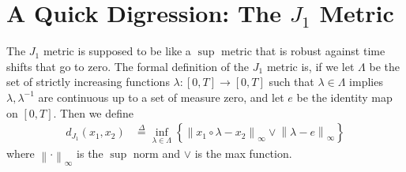 \documentclass[12pt]{article}
\newcommand\norm[1]{\left\lVert#1\right\rVert}
\newcommand{\define}{\overset{\Delta}{=}}
\theoremstyle{definition}
\theoremstyle{definition}
\theoremstyle{definition}
\begin{document}
\section*{A Quick Digression: The $J_1$ Metric}
The $J_1$ metric is supposed to be like a $\sup$ metric that is robust against time shifts that go to zero. The formal definition of the $J_1$ metric is, if we let $\Lambda$ be the set of strictly increasing functions $\lambda:[0,T]\rightarrow [0,T]$ such that $\lambda\in \Lambda$ implies $\lambda,\lambda^{-1}$ are continuous up to a set of measure zero, and let $e$ be the identity map on $[0,T]$. Then we define
\begin{align}
d_{J_1}(x_1,x_2)&\define\inf_{\lambda\in \Lambda}\left\{\norm{x_1\circ \lambda -x_2}_{\infty}\lor \norm{\lambda-e}_{\infty}\right\}\label{J1Norm}
\end{align}
where $\norm{\cdot}_{\infty}$ is the $\sup$ norm and $\lor$ is the max function.\\
\end{document}
